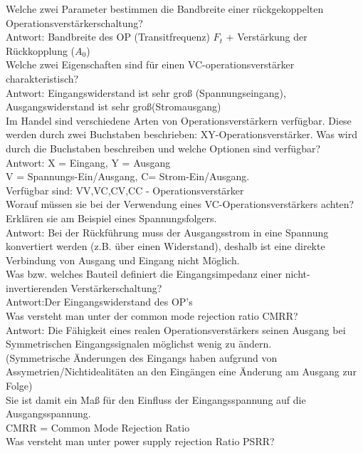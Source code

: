\documentclass[A4]{scrartcl}
\begin{document}
  Welche zwei Parameter bestimmen die Bandbreite einer rückgekoppelten\\ 
  Operationsverstärkerschaltung?\\
  \bigskip Antwort: Bandbreite des OP (Transitfrequenz) $F_t$ + Verstärkung der Rückkopplung ($A_0$)\\
  Welche zwei Eigenschaften sind für einen VC-operationsverstärker charakteristisch?\\
  \bigskip Antwort: Eingangswiderstand ist sehr groß (Spannungseingang), Ausgangswiderstand ist sehr groß(Stromausgang)\\
  Im Handel sind verschiedene Arten von Operationsverstärkern verfügbar. Diese werden durch zwei Buchstaben beschrieben: XY-Operationsverstärker. 
  Was wird durch die Buchstaben beschreiben und welche Optionen sind verfügbar?\\
  Antwort: X = Eingang, Y = Ausgang\\
  V = Spannungs-Ein/Ausgang, C= Strom-Ein/Ausgang.\\
  \bigskip Verfügbar sind: VV,VC,CV,CC - Operationsverstärker \\
  Worauf müssen sie bei der Verwendung eines VC-Operationsverstärkers achten?\\ 
  Erklären sie am Beispiel eines Spannungsfolgers.\\  
  \bigskip Antwort: Bei der Rückführung muss der Ausgangsstrom in eine Spannung konvertiert werden (z.B. über einen Widerstand), deshalb ist eine direkte Verbindung von Ausgang und Eingang nicht Möglich.\\
  Was bzw. welches Bauteil definiert die Eingangsimpedanz einer nicht-invertierenden Verstärkerschaltung?\\
  \bigskip   Antwort:Der Eingangswiderstand des OP's\\
  Was versteht man unter der common mode rejection ratio CMRR?\\  
  Antwort: Die Fähigkeit eines realen Operationsverstärkers seinen Ausgang bei Symmetrischen Eingangssignalen möglichst wenig zu ändern.\\
  (Symmetrische Änderungen des Eingangs haben aufgrund von Assymetrien/Nichtidealitäten an den Eingängen eine Änderung am Ausgang zur Folge)\\
  \bigskip Sie ist damit ein Maß für den Einfluss der Eingangsspannung auf die Ausgangsspannung.\\
  CMRR = Common Mode Rejection Ratio\\
  Was versteht man unter power supply rejection Ratio PSRR?\\
\end{document}
